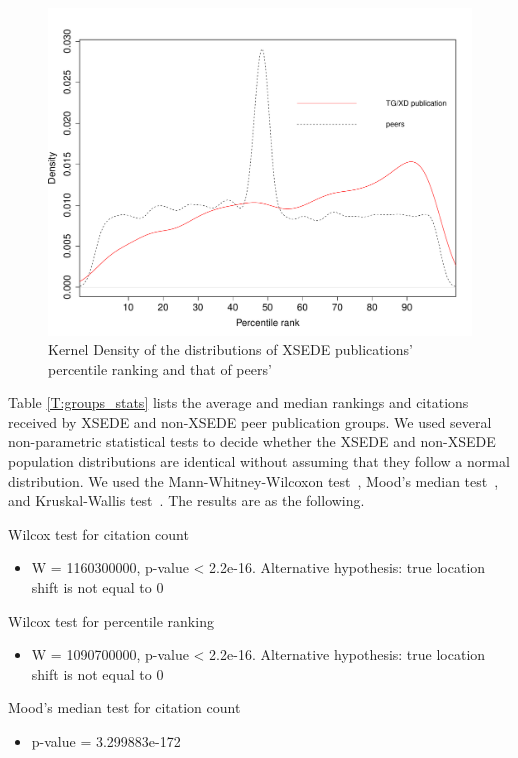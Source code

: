 \documentclass{sig-alternate}
\begin{document}
\begin{figure}[htb!]
    \includegraphics[width=0.95\columnwidth]{images/ptranking_distribution.pdf}
    \caption{Kernel Density of the distributions
of XSEDE publications' percentile ranking and that of peers'}
    \label{F:xd_peers_density}
\end{figure}

Table \ref{T:groups_stats} lists the average and median rankings and
citations received by XSEDE and non-XSEDE peer publication groups.  We
used several non-parametric statistical tests to decide whether the
XSEDE and non-XSEDE population distributions are identical without
assuming that they follow a normal distribution.  We used the
Mann-Whitney-Wilcoxon test~\cite{mann1947test}, Mood's median
test~\cite{brown1951median}, and Kruskal-Wallis
test~\cite{kruskal1952use}. The results are as the following.

Wilcox test for citation count
\begin{itemize}
\item W = 1160300000, p-value < 2.2e-16. Alternative hypothesis: true location shift is not equal to 0
\end{itemize}

Wilcox test for percentile ranking
\begin{itemize}
\item W = 1090700000, p-value < 2.2e-16. Alternative hypothesis: true location shift is not equal to 0
\end{itemize}

Mood's median test for citation count
\begin{itemize}
\item p-value = 3.299883e-172
\end{itemize}
\end{document}
